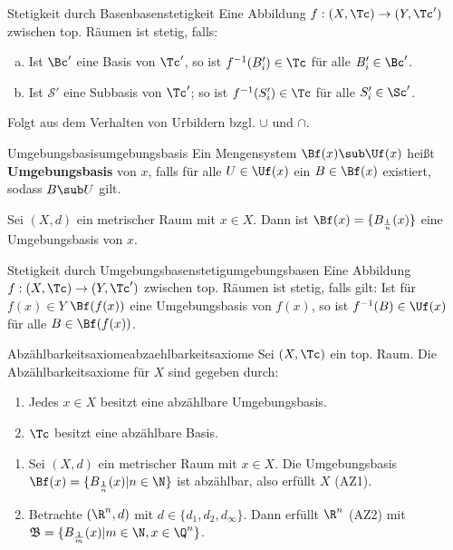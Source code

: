 \begin{satz}{Stetigkeit durch Basen}{basenstetigkeit}
Eine Abbildung $f: (X, \Tc) \to (Y, \Tc')$ zwischen top. Räumen ist stetig, falls:
\begin{enumerate}[(a)]
\item Ist $\Bc'$ eine Basis von $\Tc'$, so  ist $f^{-1}(B_i') \in \Tc$ für alle $B_i' \in \Bc'$.
\item Ist $\mathcal{S}'$ eine Subbasis von $\Tc'$; so ist $f^{-1} (S_i') \in \Tc$ für alle $S_i'\in \Sc'$.
\end{enumerate}
\end{satz}
\begin{beweis}
Folgt aus dem Verhalten von Urbildern bzgl. $\cup$ und $\cap$.
\end{beweis}
\begin{definition}{Umgebungsbasis}{umgebungsbasis}
Ein Mengensystem $\Bf (x) \sub \Uf (x)$ heißt \textbf{Umgebungsbasis} von $x$, falls für alle $U \in \Uf (x)$ ein $B \in \Bf (x)$ existiert, sodass $B \sub U$ gilt.
\end{definition}
\begin{beispiel}
Sei $(X,d)$ ein metrischer Raum mit $x \in X$. Dann ist $\Bf (x) = \{B_{\frac{1}{n}}(x) \}$ eine Umgebungsbasis von $x$.
\end{beispiel}
\begin{satz}{Stetigkeit durch Umgebungsbasen}{stetigumgebungsbasen}
Eine Abbildung $f: (X, \Tc) \to (Y, \Tc')$ zwischen top. Räumen ist stetig, falls gilt:
Ist für $f(x) \in Y$ $\Bf (f(x))$ eine Umgebungsbasis von $f(x)$, so ist $f^{-1}(B) \in \Uf (x)$ für alle $B \in \Bf (f(x))$.
\end{satz}
\begin{definition}{Abzählbarkeitsaxiome}{abzaehlbarkeitsaxiome}
Sei $(X,\Tc)$ ein top. Raum. Die Abzählbarkeitsaxiome für $X$ sind gegeben durch:
\begin{enumerate}[({AZ} 1)]
\item Jedes $x \in X$ besitzt eine abzählbare Umgebungsbasis.
\item $\Tc$ besitzt eine abzählbare Basis.
\end{enumerate}
\end{definition}
\begin{beispiele}
\begin{enumerate}
\item Sei $(X,d)$ ein metrischer Raum mit $x \in X$. Die Umgebungsbasis $\Bf (x) = \{B_{\frac{1}{n}}(x)|n \in \N\}$ ist abzählbar, also erfüllt $X$ (AZ1).
\item Betrachte $(\R^n, d)$ mit $d \in  \{d_1,d_2,d_\infty\}$. Dann erfüllt $\R^n$ (AZ2) mit $\mathfrak{B} = \{B_{\frac{1}{m}}(x)| m\in \N, x \in \Q^n \}$.
\end{enumerate}
\end{beispiele}

